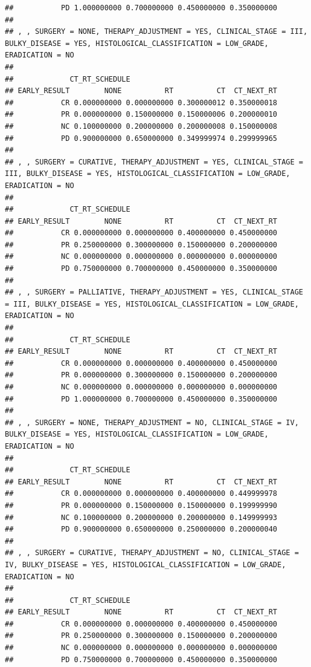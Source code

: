 \documentclass[]{article}
\begin{document}
\begin{verbatim}
##           PD 1.000000000 0.700000000 0.450000000 0.350000000
## 
## , , SURGERY = NONE, THERAPY_ADJUSTMENT = YES, CLINICAL_STAGE = III, BULKY_DISEASE = YES, HISTOLOGICAL_CLASSIFICATION = LOW_GRADE, ERADICATION = NO
## 
##             CT_RT_SCHEDULE
## EARLY_RESULT        NONE          RT          CT  CT_NEXT_RT
##           CR 0.000000000 0.000000000 0.300000012 0.350000018
##           PR 0.000000000 0.150000000 0.150000006 0.200000010
##           NC 0.100000000 0.200000000 0.200000008 0.150000008
##           PD 0.900000000 0.650000000 0.349999974 0.299999965
## 
## , , SURGERY = CURATIVE, THERAPY_ADJUSTMENT = YES, CLINICAL_STAGE = III, BULKY_DISEASE = YES, HISTOLOGICAL_CLASSIFICATION = LOW_GRADE, ERADICATION = NO
## 
##             CT_RT_SCHEDULE
## EARLY_RESULT        NONE          RT          CT  CT_NEXT_RT
##           CR 0.000000000 0.000000000 0.400000000 0.450000000
##           PR 0.250000000 0.300000000 0.150000000 0.200000000
##           NC 0.000000000 0.000000000 0.000000000 0.000000000
##           PD 0.750000000 0.700000000 0.450000000 0.350000000
## 
## , , SURGERY = PALLIATIVE, THERAPY_ADJUSTMENT = YES, CLINICAL_STAGE = III, BULKY_DISEASE = YES, HISTOLOGICAL_CLASSIFICATION = LOW_GRADE, ERADICATION = NO
## 
##             CT_RT_SCHEDULE
## EARLY_RESULT        NONE          RT          CT  CT_NEXT_RT
##           CR 0.000000000 0.000000000 0.400000000 0.450000000
##           PR 0.000000000 0.300000000 0.150000000 0.200000000
##           NC 0.000000000 0.000000000 0.000000000 0.000000000
##           PD 1.000000000 0.700000000 0.450000000 0.350000000
## 
## , , SURGERY = NONE, THERAPY_ADJUSTMENT = NO, CLINICAL_STAGE = IV, BULKY_DISEASE = YES, HISTOLOGICAL_CLASSIFICATION = LOW_GRADE, ERADICATION = NO
## 
##             CT_RT_SCHEDULE
## EARLY_RESULT        NONE          RT          CT  CT_NEXT_RT
##           CR 0.000000000 0.000000000 0.400000000 0.449999978
##           PR 0.000000000 0.150000000 0.150000000 0.199999990
##           NC 0.100000000 0.200000000 0.200000000 0.149999993
##           PD 0.900000000 0.650000000 0.250000000 0.200000040
## 
## , , SURGERY = CURATIVE, THERAPY_ADJUSTMENT = NO, CLINICAL_STAGE = IV, BULKY_DISEASE = YES, HISTOLOGICAL_CLASSIFICATION = LOW_GRADE, ERADICATION = NO
## 
##             CT_RT_SCHEDULE
## EARLY_RESULT        NONE          RT          CT  CT_NEXT_RT
##           CR 0.000000000 0.000000000 0.400000000 0.450000000
##           PR 0.250000000 0.300000000 0.150000000 0.200000000
##           NC 0.000000000 0.000000000 0.000000000 0.000000000
##           PD 0.750000000 0.700000000 0.450000000 0.350000000

\end{verbatim}
\end{document}
